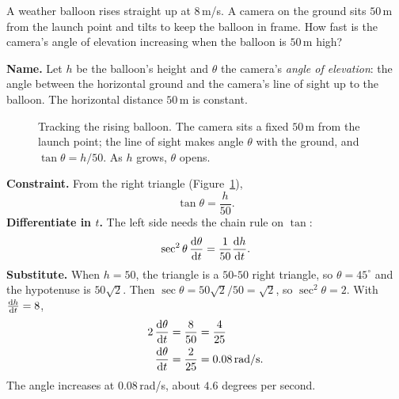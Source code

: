 \begin{example}
\label{ch13:ex-angle}
A weather balloon rises straight up at $8$\,m/s. A camera on the ground sits $50$\,m from the launch
point and tilts to keep the balloon in frame. How fast is the camera's angle of elevation increasing
when the balloon is $50$\,m high?

\textbf{Name.} Let $h$ be the balloon's height and $\theta$ the camera's \emph{angle of elevation}:
the angle between the horizontal ground and the camera's line of sight up to the balloon. The
horizontal distance $50$\,m is constant.

\begin{figure}[H]
\centering
{}
\caption{Tracking the rising balloon. The camera sits a fixed $50$\,m from the launch point; the
line of sight makes angle $\theta$ with the ground, and $\tan\theta = h/50$. As $h$ grows, $\theta$
opens.}
\label{ch13:fig-camera}
\end{figure}

\textbf{Constraint.} From the right triangle (Figure~\ref{ch13:fig-camera}),
\[
\tan\theta = \frac{h}{50}.
\]
\textbf{Differentiate in $t$.} The left side needs the chain rule on $\tan$:
\[
\sec^2\theta\,\frac{\mathrm{d} \theta}{\mathrm{d} t} = \frac{1}{50}\frac{\mathrm{d} h}{\mathrm{d} t}.
\]
\textbf{Substitute.} When $h=50$, the triangle is a $50$-$50$ right triangle, so $\theta = 45^\circ$
and the hypotenuse is $50\sqrt2$. Then $\sec\theta = 50\sqrt2/50 = \sqrt2$, so
$\sec^2\theta = 2$. With $\frac{\mathrm{d} h}{\mathrm{d} t}=8$,
\begin{align*}
2\,\frac{\mathrm{d} \theta}{\mathrm{d} t} &= \frac{8}{50} = \frac{4}{25} \\
\frac{\mathrm{d} \theta}{\mathrm{d} t} &= \frac{2}{25} = 0.08\,\text{rad/s}.
\end{align*}
The angle increases at $0.08$\,rad/s, about $4.6$ degrees per second.
\end{example}

